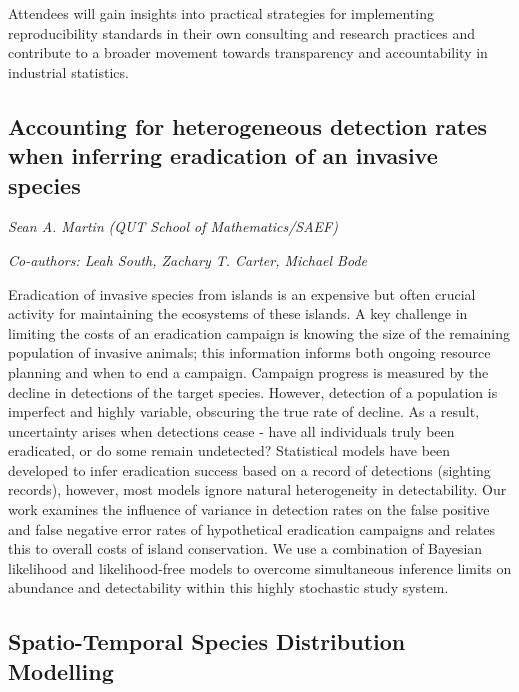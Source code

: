 \documentclass[
]{scrreprt}
\begin{document}
Attendees will gain insights into practical strategies for implementing
reproducibility standards in their own consulting and research practices
and contribute to a broader movement towards transparency and
accountability in industrial statistics.

\subsection{Accounting for heterogeneous detection rates when inferring
eradication of an invasive
species}\label{accounting-for-heterogeneous-detection-rates-when-inferring-eradication-of-an-invasive-species}

\emph{Sean A. Martin} \emph{(QUT School of
Mathematics/SAEF)}

\emph{Co-authors: Leah South, Zachary T. Carter, Michael Bode}

\setlength{\parskip}{0.5em}

Eradication of invasive species from islands is an expensive but often
crucial activity for maintaining the ecosystems of these islands. A key
challenge in limiting the costs of an eradication campaign is knowing
the size of the remaining population of invasive animals; this
information informs both ongoing resource planning and when to end a
campaign. Campaign progress is measured by the decline in detections of
the target species. However, detection of a population is imperfect and
highly variable, obscuring the true rate of decline. As a result,
uncertainty arises when detections cease - have all individuals truly
been eradicated, or do some remain undetected? Statistical models have
been developed to infer eradication success based on a record of
detections (sighting records), however, most models ignore natural
heterogeneity in detectability. Our work examines the influence of
variance in detection rates on the false positive and false negative
error rates of hypothetical eradication campaigns and relates this to
overall costs of island conservation. We use a combination of Bayesian
likelihood and likelihood-free models to overcome simultaneous inference
limits on abundance and detectability within this highly stochastic
study system.

\subsection{Spatio-Temporal Species Distribution
Modelling}\label{spatio-temporal-species-distribution-modelling}
\end{document}
